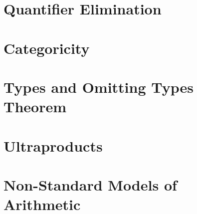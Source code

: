 \documentclass[../../../main.tex]{subfiles}
\begin{document}

\section{Quantifier Elimination}
\section{Categoricity}
\section{Types and Omitting Types Theorem}
\section{Ultraproducts}
\section{Non-Standard Models of Arithmetic}

\printbibliography[
    heading=subbibintoc,
    title={References}
]
\end{document}
